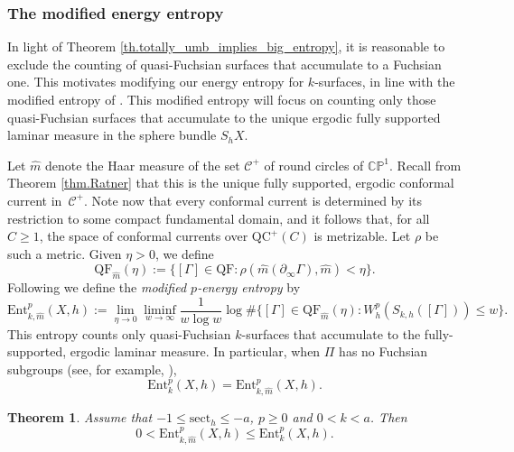 \documentclass[JEP,XML,SOM,Unicode,NoEqCountersInSection,published]{cedram}
\newcommand{\ksurfaces}{$k$\nobreakdash-surfaces\xspace}
\theoremstyle{plain}
\newtheorem{theorem}{Theorem}[section]
\theoremstyle{definition}
\newcommand{\C}{{\mathbb C}}
\newcommand{\PP}{{\mathbb P}}
\newcommand{\cC}{{\mathcal C}}
\newcommand{\sect}{\mathrm{sect}}
\newcommand{\Ent}{\mathrm{Ent}}
\newcommand{\QF}{\mathrm{QF}}
\newcommand{\QC}{\mathrm{QC}}
\newcommand{\bord}{\partial_{\infty}}
\begin{document}
\subsubsection{The modified energy entropy}\label{sss.Modified_entropy}
In light of Theorem \ref{th.totally_umb_implies_big_entropy}, it is reasonable to exclude the counting of quasi-Fuchsian surfaces that accumulate to a Fuchsian one. This motivates modifying our energy entropy for \ksurfaces, in line with the modified entropy of \cite{MN_currents}. This modified entropy will focus on counting only those quasi-Fuchsian surfaces that accumulate to the unique ergodic fully supported laminar measure in the sphere bundle $S_hX$.

Let $\hat m$ denote the Haar measure of the set $\cC^+$ of round circles of $\C\PP^1$. Recall from Theorem \ref{thm.Ratner} that this is the unique fully supported, ergodic conformal current in~$\cC^+$. Note now that every conformal current is determined by its restriction to some compact fundamental domain, and it follows that, for all $C\geq 1$, the space of conformal currents over $\QC^+(C)$ is metrizable. Let $\rho$ be such a metric. Given $\eta>0$, we define
\begin{equation*}
\QF_{\hat m}(\eta):=\bigl\{[\Gamma]\in\QF:\rho(\hat m(\bord\Gamma),\hat m)<\eta\bigr\}.
\end{equation*}
Following \cite{MN_currents} we define the \emph{modified $p$-energy entropy} by
\begin{equation*}
\Ent^p_{k,\hat m}(X,h):=\lim_{\eta\to 0}\liminf_{w\to\infty}\frac{1}{w\log w}\log\#\bigl\{[\Gamma]\in\QF_{\hat m}(\eta):W^{p}_{h}(S_{k,h}([\Gamma]))\leq w\bigr\}.
\end{equation*}
This entropy counts only quasi-Fuchsian \ksurfaces that accumulate to the fully-supported, ergodic laminar measure. In particular, when $\Pi$ has no Fuchsian subgroups (see, for example, \cite[\S 5.3]{MR03}),
\begin{equation*}
\Ent^{p}_{k}(X,h)=\Ent^{p}_{k,\hat m}(X,h).
\end{equation*}

\begin{theorem}
Assume that $-1\leq\sect_h\leq-a$, $p\geq 0$ and $0<k<a$. Then
\begin{equation*}
0<\Ent^{p}_{k,\hat m}(X,h)\leq\Ent^{p}_{k}(X,h).
\end{equation*}
\end{theorem}
\end{document}
